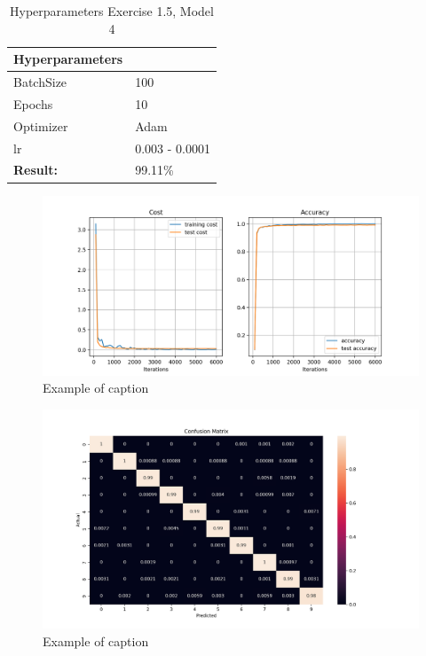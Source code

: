 \documentclass[a4paper,10pt]{article}
\begin{document}
\begin{table}[ht!]
\centering
\begin{tabular}{ll}\hline 
 \textbf{Hyperparameters}&    \\ \hline
 BatchSize&  100  \\
 Epochs&  10 \\ 
 Optimizer& Adam  \\
 lr& 0.003 - 0.0001 \\ \hline
\textbf{Result: }&   99.11\% \\ \hline
\end{tabular}
\caption{Hyperparameters Exercise 1.5, Model 4}
\label{tab:tab7}
\end{table}

\begin{figure}[ht!]
\centering
\includegraphics[width=120mm]{figures/assignment_3/improved_torch4.png}
\caption{Example of caption}
\label{fig:example}
\end{figure}

\begin{figure}[ht!]
\centering
\includegraphics[width=120mm]{figures/assignment_3/improved_torch4_CM.png}
\caption{Example of caption}
\label{fig:example}
\end{figure}
\end{document}
